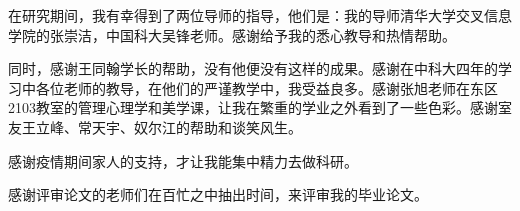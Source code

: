 
\begin{acknowledgements}

在研究期间，我有幸得到了两位导师的指导，他们是：我的导师清华大学交叉信息学院的张崇洁，中国科大吴锋老师。感谢给予我的悉心教导和热情帮助。

同时，感谢王同翰学长的帮助，没有他便没有这样的成果。感谢在中科大四年的学习中各位老师的教导，在他们的严谨教学中，我受益良多。感谢张旭老师在东区2103教室的管理心理学和美学课，让我在繁重的学业之外看到了一些色彩。感谢室友王立峰、常天宇、奴尔江的帮助和谈笑风生。

感谢疫情期间家人的支持，才让我能集中精力去做科研。

感谢评审论文的老师们在百忙之中抽出时间，来评审我的毕业论文。

\end{acknowledgements}
